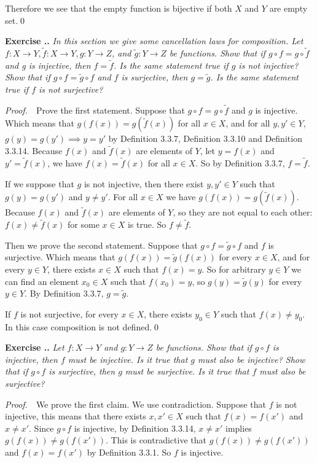 \documentclass{book}
\newcommand{\pff}{\vspace{.25em}\noindent\emph{Proof.}~~}
\newcounter{Exercise}[section]
\renewcommand{\theExercise}{\thesection.\arabic{Exercise}.}
\newcommand{\new}{\vspace{1.5em}\noindent\textbf{{Exercise \stepcounter{Exercise}\textbf{\theExercise}}} }
\begin{document}
Therefore we see that the empty function is bijective if both $X$ and $Y$ are empty set.\qed

\new\emph{In this section we give some cancellation laws for composition. Let $f:X\to Y,\tilde{f}:X\to Y,g: Y\to Z$, and $\tilde{g}:Y\to Z$ be functions. Show that if $g\circ f=g\circ\tilde{f}$ and g is injective, then $f=\tilde{f}$. Is the same statement true if $g$ is not injective? Show that if $g\circ f=\tilde{g}\circ f$ and $f$ is surjective, then $g=\tilde{g}$. Is the same statement true if $f$ is not surjective?}

\pff Prove the first statement. Suppose that $g\circ f=g\circ\tilde{f}$ and $g$ is injective. Which means that $g(f(x))=g(\tilde{f}(x))$ for all $x\in X$, and for all $y,y'\in Y$, $g(y)=g(y')\implies y=y'$ by Definition 3.3.7, Definition 3.3.10 and Definition 3.3.14. Because $f(x)$ and $\tilde{f}(x)$ are elements of $Y$, let $y=f(x)$ and $y'=\tilde{f}(x)$, we have $f(x)=\tilde{f}(x)$ for all $x\in X$. So by Definition 3.3.7, $f=\tilde{f}$.

If we suppose that $g$ is not injective, then there exist $y,y'\in Y$ such that $g(y)=g(y')$ and $y\neq y'$. For all $x\in X$ we have $g(f(x))=g(\tilde{f}(x))$. Because $f(x)$ and $\tilde{f}(x)$ are elements of $Y$, so they are not equal to each other: $f(x)\ne\tilde{f}(x)$ for some $x\in X$ is true. So $f\ne\tilde{f}$.

Then we prove the second statement. Suppose that $g\circ f=\tilde{g}\circ f$ and $f$ is surjective. Which means that $g(f(x))=\tilde{g}(f(x))$ for every $x\in X$, and for every $y\in Y$, there exists $x\in X$ such that $f(x)=y$. So for arbitrary $y\in Y$ we can find an element $x_0\in X$ such that $f(x_0)=y$, so $g(y)=\tilde{g}(y)$ for every $y\in Y$. By Definition 3.3.7, $g=\tilde{g}$.

If $f$ is not surjective, for every $x\in X$, there exists $y_0\in Y$ such that $f(x)\neq y_0$. In this case composition is not defined.\qed

\new\emph{Let $f: X\to Y$ and $g:Y\to Z$ be functions. Show that if $g\circ f$ is injective, then $f$ must be injective. Is it true that $g$ must also be injective? Show that if $g\circ f$ is surjective, then $g$ must be surjective. Is it true that $f$ must also be surjective?}

\pff We prove the first claim. We use contradiction. Suppose that $f$ is not injective, this means that there exists $x,x'\in X$ such that $f(x)=f(x')$ and $x\neq x'$. Since $g\circ f$ is injective, by Definition 3.3.14, $x\neq x'$ implies $g(f(x))\neq g(f(x'))$. This is contradictive that $g(f(x))\neq g(f(x'))$ and $f(x)=f(x')$ by Definition 3.3.1. So $f$ is injective.
\end{document}
